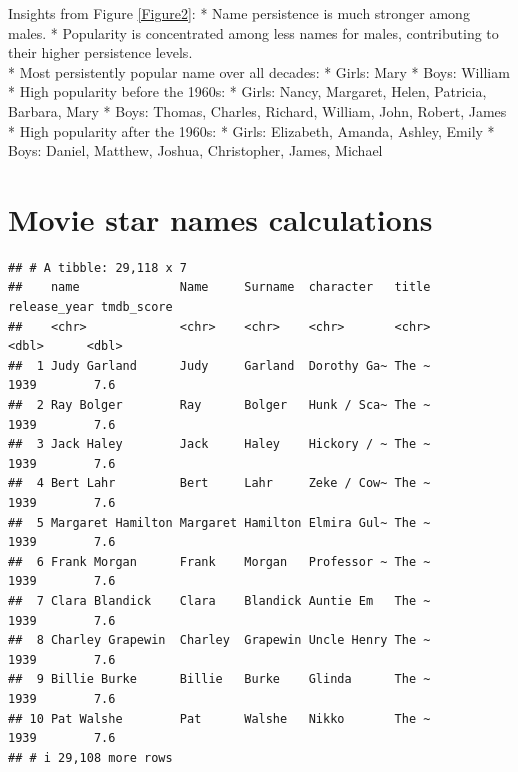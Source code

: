 \documentclass[11pt,preprint]{elsarticle}
\numberwithin{equation}{section}
\numberwithin{figure}{section}
\numberwithin{table}{section}
\begin{document}
Insights from Figure \ref{Figure2}: * Name persistence is much stronger
among males. * Popularity is concentrated among less names for males,
contributing to their higher persistence levels.\\
* Most persistently popular name over all decades: * Girls: Mary * Boys:
William * High popularity before the 1960s: * Girls: Nancy, Margaret,
Helen, Patricia, Barbara, Mary * Boys: Thomas, Charles, Richard,
William, John, Robert, James * High popularity after the 1960s: * Girls:
Elizabeth, Amanda, Ashley, Emily * Boys: Daniel, Matthew, Joshua,
Christopher, James, Michael

\newpage

\section{Movie star names
calculations}\label{movie-star-names-calculations}

\begin{verbatim}
## # A tibble: 29,118 x 7
##    name              Name     Surname  character   title release_year tmdb_score
##    <chr>             <chr>    <chr>    <chr>       <chr>        <dbl>      <dbl>
##  1 Judy Garland      Judy     Garland  Dorothy Ga~ The ~         1939        7.6
##  2 Ray Bolger        Ray      Bolger   Hunk / Sca~ The ~         1939        7.6
##  3 Jack Haley        Jack     Haley    Hickory / ~ The ~         1939        7.6
##  4 Bert Lahr         Bert     Lahr     Zeke / Cow~ The ~         1939        7.6
##  5 Margaret Hamilton Margaret Hamilton Elmira Gul~ The ~         1939        7.6
##  6 Frank Morgan      Frank    Morgan   Professor ~ The ~         1939        7.6
##  7 Clara Blandick    Clara    Blandick Auntie Em   The ~         1939        7.6
##  8 Charley Grapewin  Charley  Grapewin Uncle Henry The ~         1939        7.6
##  9 Billie Burke      Billie   Burke    Glinda      The ~         1939        7.6
## 10 Pat Walshe        Pat      Walshe   Nikko       The ~         1939        7.6
## # i 29,108 more rows
\end{verbatim}
\end{document}
